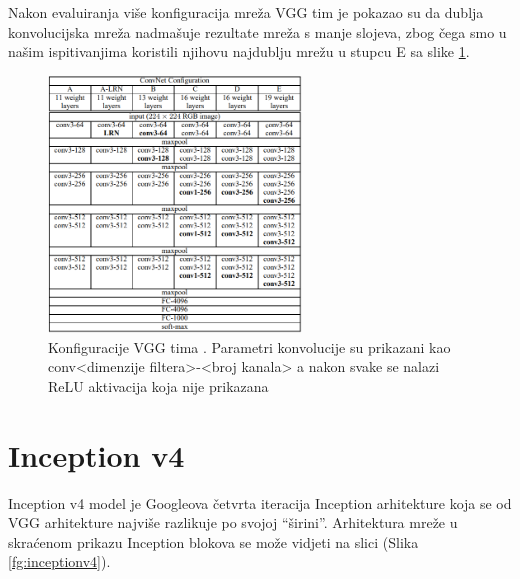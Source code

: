 \documentclass[times, utf8, proizvoljni, numeric]{fer}
\begin{document}
Nakon evaluiranja više konfiguracija mreža VGG tim je pokazao su da dublja konvolucijska mreža nadmašuje rezultate mreža s manje slojeva, zbog čega smo u našim ispitivanjima koristili njihovu najdublju mrežu u stupcu E sa slike \ref{fg:vgg}.

\begin{figure}[!ht]
	\begin{center}
		\captionsetup{justification=centering}
		\includegraphics[width=0.6\textwidth]{./imgs/vgg.png}
		\caption{Konfiguracije VGG tima \cite{VGG}. Parametri konvolucije su prikazani kao conv<dimenzije filtera>-<broj kanala> a nakon svake se nalazi ReLU aktivacija koja nije prikazana}
		\label{fg:vgg}
	\end{center}
\end{figure}

\section{Inception v4}

Inception v4 model je Googleova četvrta iteracija Inception arhitekture koja se od VGG arhitekture najviše razlikuje po svojoj “širini”.  Arhitektura mreže u skraćenom prikazu Inception blokova se može vidjeti na slici (Slika \ref{fg:inceptionv4}). 
\end{document}
